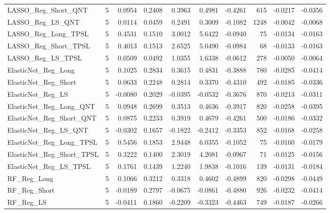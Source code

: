 \begin{tabular}{llrrrrrrrr}
\cline{1-10}
LASSO\_Reg\_Short\_QNT & 5 & 0.0954 & 0.2408 & 0.3963 & 0.4981 & -0.4261 & 615 & -0.0217 & -0.0356 \\
\cline{1-10}
LASSO\_Reg\_LS\_QNT & 5 & 0.0114 & 0.0459 & 0.2491 & 0.3009 & -0.1082 & 1248 & -0.0042 & -0.0068 \\
\cline{1-10}
LASSO\_Reg\_Long\_TPSL & 5 & 0.4531 & 0.1510 & 3.0012 & 5.6422 & -0.0940 & 75 & -0.0134 & -0.0163 \\
\cline{1-10}
LASSO\_Reg\_Short\_TPSL & 5 & 0.4013 & 0.1513 & 2.6525 & 5.0490 & -0.0984 & 68 & -0.0133 & -0.0163 \\
\cline{1-10}
LASSO\_Reg\_LS\_TPSL & 5 & 0.0509 & 0.0492 & 1.0355 & 1.6338 & -0.0612 & 278 & -0.0050 & -0.0064 \\
\cline{1-10}
ElasticNet\_Reg\_Long & 5 & 0.1025 & 0.2834 & 0.3615 & 0.4831 & -0.3888 & 780 & -0.0285 & -0.0414 \\
\cline{1-10}
ElasticNet\_Reg\_Short & 5 & 0.0633 & 0.2248 & 0.2814 & 0.3370 & -0.4310 & 492 & -0.0185 & -0.0336 \\
\cline{1-10}
ElasticNet\_Reg\_LS & 5 & -0.0080 & 0.2029 & -0.0395 & -0.0532 & -0.3676 & 870 & -0.0213 & -0.0311 \\
\cline{1-10}
ElasticNet\_Reg\_Long\_QNT & 5 & 0.0948 & 0.2699 & 0.3513 & 0.4636 & -0.3917 & 820 & -0.0258 & -0.0395 \\
\cline{1-10}
ElasticNet\_Reg\_Short\_QNT & 5 & 0.0875 & 0.2233 & 0.3919 & 0.4679 & -0.4261 & 500 & -0.0186 & -0.0332 \\
\cline{1-10}
ElasticNet\_Reg\_LS\_QNT & 5 & -0.0302 & 0.1657 & -0.1822 & -0.2412 & -0.3353 & 852 & -0.0168 & -0.0258 \\
\cline{1-10}
ElasticNet\_Reg\_Long\_TPSL & 5 & 0.5456 & 0.1853 & 2.9448 & 6.0355 & -0.1052 & 75 & -0.0160 & -0.0179 \\
\cline{1-10}
ElasticNet\_Reg\_Short\_TPSL & 5 & 0.3222 & 0.1400 & 2.3019 & 4.2081 & -0.0967 & 71 & -0.0125 & -0.0156 \\
\cline{1-10}
ElasticNet\_Reg\_LS\_TPSL & 5 & 0.1761 & 0.1439 & 1.2240 & 1.9838 & -0.1016 & 139 & -0.0131 & -0.0184 \\
\cline{1-10}
RF\_Reg\_Long & 5 & 0.1066 & 0.3212 & 0.3318 & 0.4602 & -0.4899 & 820 & -0.0298 & -0.0449 \\
\cline{1-10}
RF\_Reg\_Short & 5 & -0.0189 & 0.2797 & -0.0675 & -0.0861 & -0.4880 & 926 & -0.0232 & -0.0414 \\
\cline{1-10}
RF\_Reg\_LS & 5 & -0.0411 & 0.1860 & -0.2209 & -0.3323 & -0.4463 & 749 & -0.0187 & -0.0266 \\

\end{tabular}
